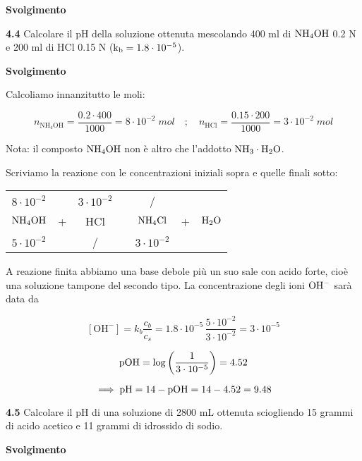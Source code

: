\vspace{0.2cm}\large\textbf{Svolgimento}\normalsize

\vspace{0.2cm}

\vspace{0.2cm}\textbf{4.4} Calcolare il pH della soluzione ottenuta mescolando 400 ml di $\rm NH_4OH$ 0.2 N e 200 ml di HCl 0.15 N ($\rm k_b = 1.8 \cdot 10^{-5}$).

\vspace{0.2cm}\large\textbf{Svolgimento}\normalsize

\vspace{0.2cm}Calcoliamo innanzitutto le moli:

$$n_{\text{NH}_4\text{OH}}=\frac{0.2 \cdot 400}{1000}=8 \cdot 10^{-2} \; mol
\quad ; \quad
n_{\text{HCl}}=\frac{0.15 \cdot 200}{1000}=3 \cdot 10^{-2} \; mol$$

Nota: il composto $\rm NH_4OH$ non è altro che l'addotto $\rm NH_3 \cdot H_2O$.

Scriviamo la reazione con le concentrazioni iniziali sopra e quelle finali sotto:

\begin{center}
    \begin{tabular}{ccccccc}
        $8 \cdot 10^{-2}$ &  & $3 \cdot 10^{-2}$ & & / &&\\
        $\rm NH_4OH$ & + & HCl & \ce{->} & $\rm NH_4Cl$ & + & $\rm H_2O$\\
        $5 \cdot 10^{-2}$ &  &  / & & $3 \cdot 10^{-2}$&&\\
    \end{tabular}
\end{center}

A reazione finita abbiamo una base debole più un suo sale con acido forte, cioè una soluzione tampone del secondo tipo. La concentrazione degli ioni $\rm OH^-$ sarà data da

$$[\text{OH}^-]=k_b\frac{c_b}{c_s}
=1.8 \cdot 10^{-5}\,\frac{5 \cdot 10^{-2}}{3 \cdot 10^{-2}}= 3 \cdot 10^{-5}$$

$$\rm pOH=\log\left(\frac{1}{3 \cdot 10^{-5}}\right)=4.52$$

$$\implies \rm pH=14-pOH=14-4.52=9.48$$

\vspace{0.2cm}\textbf{4.5} Calcolare il pH di una soluzione di 2800 mL ottenuta sciogliendo 15 grammi di acido acetico e 11 grammi di idrossido di sodio.

\vspace{0.2cm}\large\textbf{Svolgimento}\normalsize


